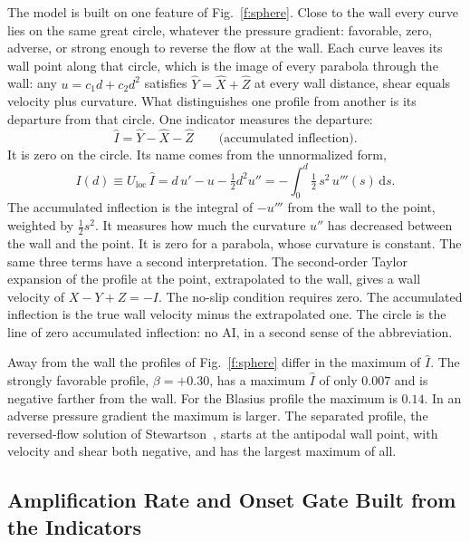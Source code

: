 \documentclass[conf]{new-aiaa}
\begin{document}
The model is built on one feature of Fig.~\ref{f:sphere}. Close to the wall
every curve lies on the same great circle, whatever the pressure gradient:
favorable, zero, adverse, or strong enough to reverse the flow at the wall.
Each curve leaves its wall point along that circle, which is the image of every parabola through the wall: any $u=c_1d+c_2d^2$ satisfies
$\hat Y=\hat X+\hat Z$ at every wall distance, shear equals velocity plus
curvature. What distinguishes one profile from another is its departure from
that circle. One indicator measures the departure:
\begin{equation}
  \hat I = \hat Y - \hat X - \hat Z
  \qquad\text{(accumulated inflection)}.
  \label{w:ihat}
\end{equation}
It is zero on the circle. Its name comes from the unnormalized form,
\begin{equation}
  I(d) \equiv U_\mathrm{loc}\,\hat I = d\,u'-u-\tfrac12 d^2u''
  = -\int_0^d \tfrac12\,s^2\,u'''(s)\,\mathrm{d}s .
  \label{w:integral}
\end{equation}
The accumulated inflection is the integral of $-u'''$ from the wall to the
point, weighted by $\tfrac12 s^2$. It measures how much the curvature $u''$
has decreased between the wall and the point. It is zero for a parabola,
whose curvature is constant. The same three terms have a second interpretation. The second-order Taylor expansion of the profile at the point, extrapolated
to the wall, gives a wall velocity of $X-Y+Z=-I$. The no-slip condition
requires zero. The accumulated inflection is the true wall velocity minus the
extrapolated one. The circle is the line of zero accumulated inflection: no
AI, in a second sense of the abbreviation.

Away from the wall the profiles of Fig.~\ref{f:sphere} differ in the maximum of
$\hat I$. The strongly favorable profile, $\beta=+0.30$, has a maximum $\hat I$ of only $0.007$ and is
negative farther from the wall. For the Blasius profile the maximum is $0.14$.
In an adverse pressure gradient the maximum is larger. The separated profile, the reversed-flow solution
of Stewartson~\cite{stewartson_1954}, starts at the antipodal wall point, with velocity and shear both negative, and has the largest maximum of all.


\subsection{Amplification Rate and Onset Gate Built from the Indicators}
\end{document}

